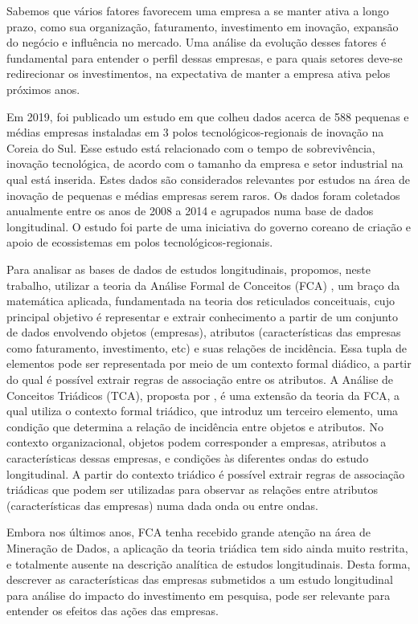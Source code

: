 \documentclass[12pt]{article}
\begin{document}
Sabemos que vários fatores favorecem uma empresa a se manter ativa a longo prazo, como sua organização, faturamento, investimento em inovação, expansão do negócio e influência no mercado. Uma análise da evolução desses fatores é fundamental para entender o perfil dessas empresas, e para quais setores deve-se redirecionar os investimentos, na expectativa de manter a empresa ativa pelos próximos anos.

Em 2019, foi publicado um estudo em \cite{KIM2019103967} que colheu dados acerca de 588 pequenas e médias empresas instaladas em 3 polos tecnológicos-regionais de inovação na Coreia do Sul. Esse estudo está relacionado com o tempo de sobrevivência, inovação tecnológica, de acordo com o tamanho da empresa e setor industrial na qual está inserida. Estes dados são considerados relevantes por estudos na área de inovação de pequenas e médias empresas serem raros. Os dados foram coletados anualmente entre os anos de 2008 a 2014 e agrupados numa base de dados longitudinal. O estudo foi parte de uma iniciativa do governo coreano de criação e apoio de ecossistemas em polos tecnológicos-regionais.

Para analisar as bases de dados de estudos longitudinais, propomos, neste trabalho, utilizar a teoria da Análise Formal de Conceitos (FCA) \cite{ganter2012formal}, um braço da matemática aplicada, fundamentada na teoria dos reticulados conceituais, cujo principal objetivo é representar e extrair conhecimento a partir de um conjunto de dados envolvendo objetos (empresas), atributos (características das empresas como faturamento, investimento, etc) e suas relações de incidência. Essa tupla de elementos pode ser representada por meio de um contexto formal diádico, a partir do qual é possível extrair regras de associação  entre os atributos. A Análise de Conceitos Triádicos (TCA), proposta por \cite{lehmann:95}, é uma extensão da teoria da FCA, a qual utiliza o contexto formal triádico, que introduz um terceiro elemento, uma condição que determina a relação de incidência entre objetos e atributos. No contexto organizacional, objetos podem corresponder a empresas, atributos a características dessas empresas, e condições às diferentes ondas do estudo longitudinal. A partir do contexto triádico é possível extrair regras de associação triádicas que podem ser utilizadas para observar as relações entre atributos (características das empresas) numa dada onda ou entre ondas. 

Embora nos últimos anos, FCA tenha recebido grande atenção na área de Mineração de Dados, a aplicação da teoria triádica tem sido ainda muito restrita, e totalmente ausente na descrição analítica de estudos longitudinais. Desta forma, descrever as características das empresas submetidos a um estudo longitudinal para análise do impacto do investimento em pesquisa, pode ser relevante para entender os efeitos das ações das empresas.
\end{document}
